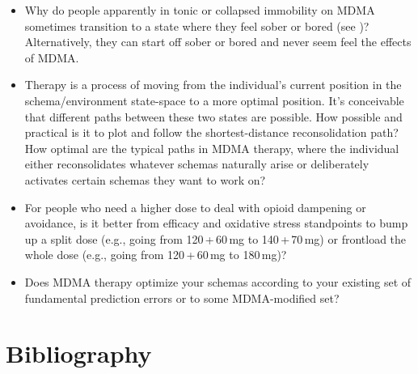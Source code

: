 \documentclass[11pt,oneside]{book}
\begin{document}
\begin{itemize}
    \item Why do people apparently in tonic or collapsed immobility on MDMA sometimes transition to a state where they feel sober or bored (see \textcite{razviDissociation})? Alternatively, they can start off sober or bored and never seem feel the effects of MDMA.
    \item Therapy is a process of moving from the individual's current position in the schema/environment state-space to a more optimal position. It's conceivable that different paths between these two states are possible. How possible and practical is it to plot and follow the shortest-distance reconsolidation path? How optimal are the typical paths in MDMA therapy, where the individual either reconsolidates whatever schemas naturally arise or deliberately activates certain schemas they want to work on?
    \item For people who need a higher dose to deal with opioid dampening or avoidance, is it better from efficacy and oxidative stress standpoints to bump up a split dose (e.g., going from 120\,+\,60\,mg to 140\,+\,70\,mg) or frontload the whole dose (e.g., going from 120\,+\,60\,mg to 180\,mg)?
    \item Does MDMA therapy optimize your schemas according to your existing set of fundamental prediction errors or to some MDMA-modified set?
\end{itemize}

\backmatter

\chapter*{Bibliography}
\printbibliography[heading=none]
\end{document}

